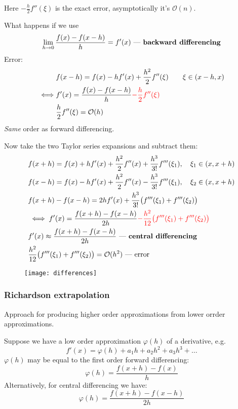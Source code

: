 Here $-\frac{h}{2} f''(\xi)$ is the exact error, asymptotically it's $\mathcal{O}(n)$.

What happens if we use
\[
    \lim_{h \to 0} \frac{f(x) - f(x-h)}{h} = f'(x) \text{ --- \textbf{backward differencing}}
\]
Error:
\begin{align*}
    &f(x - h) = f(x) - h f'(x) + \frac{h^2}{2} f''(\xi) \qquad \xi \in (x - h, x)
    \\\iff
    &f'(x) = \frac{f(x) - f(x - h)}{h} \textcolor{red}{- \frac{h}{2} f''(\xi)}
    \\&
    \frac{h}{2} f''(\xi) = \mathcal{O}(h)
\end{align*}
\textit{Same} order as forward differencing.

Now take the two Taylor series expansions and subtract them:
\begin{align*}
    &
    f(x+h) = f(x) + hf'(x) + \frac{h^2}{2} f''(x) + \frac{h^3}{3!} f'''(\xi_1),\quad \xi_1 \in (x, x + h)
    \\&
    f(x-h) = f(x) - hf'(x) + \frac{h^2}{2} f''(x) - \frac{h^3}{3!} f'''(\xi_1),\quad \xi_2 \in (x, x + h)
    \\&
    f(x + h) - f(x - h) = 2h f'(x) + \frac{h^3}{3!} \bigl(f'''(\xi_1) + f'''(\xi_2)\bigr)
    \\&
    \iff f'(x) = \frac{f(x+h) - f(x-h)}{2h} \textcolor{red}{- \frac{h^2}{12} \bigl(f'''(\xi_1) + f'''(\xi_2)\bigr)}
    \\&
    f'(x) \approx \frac{f(x+h) - f(x-h)}{2h} \text{ --- \textbf{central differencing}}
    \\&
    \frac{h^2}{12} \bigl(f'''(\xi_1) + f'''(\xi_2)\bigr) = \mathcal{O}(h^2) \text{ --- error}
\end{align*}

\begin{figure*}[h]
    \centering
    \texttt{[image: differences]}
\end{figure*}

\subsubsection{Richardson extrapolation}
Approach for producing higher order approximations from lower orrder approximations.

Suppose we have a low order approximation $\varphi(h)$ of a derivative, e.g.
\[
    f'(x) = \varphi(h) + a_1 h + a_2 h^2 + a_3 h^3 + \dots
\]
$\varphi(h)$ may be equal to the first order forward differencing:
\[
    \varphi(h) = \frac{f(x+h) - f(x)}{h}
\]
Alternatively, for central differencing we have:
\[
    \varphi(h) = \frac{f(x+h) - f(x-h)}{2h}
\]

